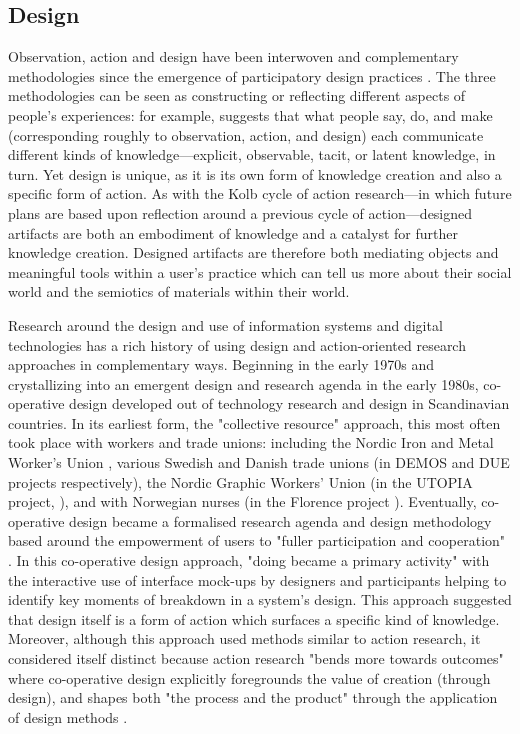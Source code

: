 \subsection{Design}
\label{3-design}
Observation, action and design have been interwoven and complementary methodologies since the emergence of participatory design practices \citep{kyng_setting_1991}. The three methodologies can be seen as constructing or reflecting different aspects of people's experiences: for example, \citet{frascara_user-centered_2002} suggests that what people say, do, and make (corresponding roughly to observation, action, and design) each communicate different kinds of knowledge—explicit, observable, tacit, or latent knowledge, in turn. Yet design is unique, as it is its own form of knowledge creation and also a specific form of action. As with the Kolb cycle of action research—in which future plans are based upon reflection around a previous cycle of action—designed artifacts are both an embodiment of knowledge and a catalyst for further knowledge creation. Designed artifacts are therefore both mediating objects and meaningful tools within a user's practice \citep{kyng_setting_1991} which can tell us more about their social world and the semiotics of materials within their world. 

Research around the design and use of information systems and digital technologies has a rich history of using design and action-oriented research approaches in complementary ways. Beginning in the early 1970s and crystallizing into an emergent design and research agenda in the early 1980s, co-operative design developed out of technology research and design in Scandinavian countries. In its earliest form, the "collective resource" approach, this most often took place with workers and trade unions: including the Nordic Iron and Metal Worker's Union \citep{nygaard_iron_1979}, various Swedish and Danish trade unions (in DEMOS and DUE projects respectively),  the Nordic Graphic Workers' Union (in the UTOPIA project, \citep{ehn_collective_1987, sundblad_utopia_2011}), and with Norwegian nurses (in the Florence project \citep{bjerknes_user_1995}). Eventually, co-operative design became a formalised research agenda and design methodology based around the empowerment of users to "fuller participation and cooperation" \citep{kyng_setting_1991}. In this co-operative design approach, "doing became a primary activity" with the interactive use of interface mock-ups by designers and participants helping to identify key moments of breakdown in a system's design. This approach suggested that design itself is a form of action which surfaces a specific kind of knowledge. Moreover, although this approach used methods similar to action research, it considered itself distinct because action research "bends more towards outcomes" where co-operative design explicitly foregrounds the value of creation (through design), and shapes both "the process and the product" through the application of design methods \citep{greenbaum_design_1993}.

